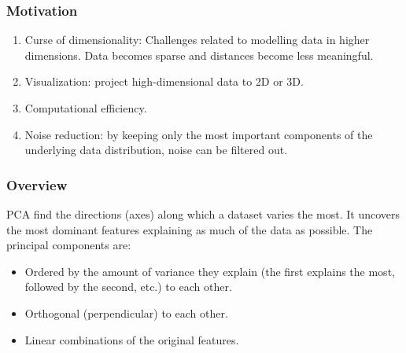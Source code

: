 \documentclass[11pt]{article}
\begin{document}
\subsubsection{Motivation}
\begin{enumerate}
    \item Curse of dimensionality: Challenges related to modelling data in higher dimensions. Data becomes sparse and distances become less meaningful.
    \item Visualization: project high-dimensional data to 2D or 3D.
    \item Computational efficiency.
    \item Noise reduction: by keeping only the most important components of the underlying data distribution, noise can be filtered out.
\end{enumerate}
\subsubsection{Overview}
PCA find the directions (axes) along which a dataset varies the most. It uncovers the most dominant features explaining as much of the data as possible.
The principal components are:
\begin{itemize}
    \item Ordered by the amount of variance they explain (the first explains the most, followed by the second, etc.) to each other.
    \item Orthogonal (perpendicular) to each other.
    \item Linear combinations of the original features.
\end{itemize}
\end{document}
